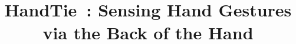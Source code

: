 \documentclass{sigchi}
\begin{document}
\newcommand{\getTitleName}{HandTie}

\title{\getTitleName\ : Sensing Hand Gestures via the Back of the Hand}


\maketitle
\end{document}
